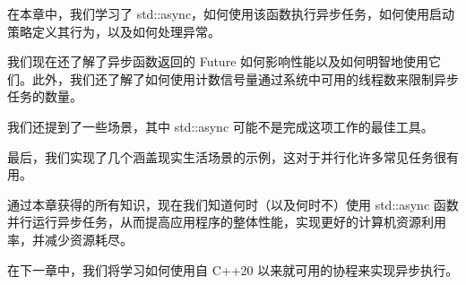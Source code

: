 在本章中，我们学习了 std::async，如何使用该函数执行异步任务，如何使用启动策略定义其行为，以及如何处理异常。

我们现在还了解了异步函数返回的 Future 如何影响性能以及如何明智地使用它们。此外，我们还了解了如何使用计数信号量通过系统中可用的线程数来限制异步任务的数量。

我们还提到了一些场景，其中 std::async 可能不是完成这项工作的最佳工具。

最后，我们实现了几个涵盖现实生活场景的示例，这对于并行化许多常见任务很有用。

通过本章获得的所有知识，现在我们知道何时（以及何时不）使用 std::async 函数并行运行异步任务，从而提高应用程序的整体性能，实现更好的计算机资源利用率，并减少资源耗尽。

在下一章中，我们将学习如何使用自 C++20 以来就可用的协程来实现异步执行。
